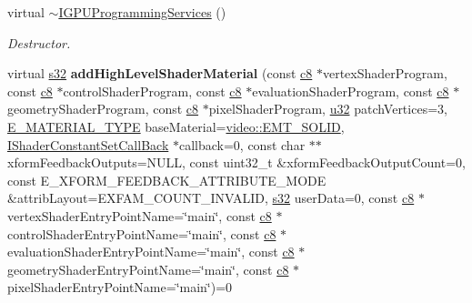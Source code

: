 \begin{DoxyCompactItemize}
\item 
virtual \hyperlink{classirr_1_1video_1_1IGPUProgrammingServices_a09d143ea5c55840c15ebcb84e8539bc0}{$\sim$\+I\+G\+P\+U\+Programming\+Services} ()\hypertarget{classirr_1_1video_1_1IGPUProgrammingServices_a09d143ea5c55840c15ebcb84e8539bc0}{}\label{classirr_1_1video_1_1IGPUProgrammingServices_a09d143ea5c55840c15ebcb84e8539bc0}

\begin{DoxyCompactList}\small\item\em Destructor. \end{DoxyCompactList}\item 
virtual \hyperlink{namespaceirr_ac66849b7a6ed16e30ebede579f9b47c6}{s32} {\bfseries add\+High\+Level\+Shader\+Material} (const \hyperlink{namespaceirr_a9395eaea339bcb546b319e9c96bf7410}{c8} $\ast$vertex\+Shader\+Program, const \hyperlink{namespaceirr_a9395eaea339bcb546b319e9c96bf7410}{c8} $\ast$control\+Shader\+Program, const \hyperlink{namespaceirr_a9395eaea339bcb546b319e9c96bf7410}{c8} $\ast$evaluation\+Shader\+Program, const \hyperlink{namespaceirr_a9395eaea339bcb546b319e9c96bf7410}{c8} $\ast$geometry\+Shader\+Program, const \hyperlink{namespaceirr_a9395eaea339bcb546b319e9c96bf7410}{c8} $\ast$pixel\+Shader\+Program, \hyperlink{namespaceirr_a0416a53257075833e7002efd0a18e804}{u32} patch\+Vertices=3, \hyperlink{namespaceirr_1_1video_ac8e9b6c66f7cebabd1a6d30cbc5430f1}{E\+\_\+\+M\+A\+T\+E\+R\+I\+A\+L\+\_\+\+T\+Y\+PE} base\+Material=\hyperlink{namespaceirr_1_1video_ac8e9b6c66f7cebabd1a6d30cbc5430f1a9bc471b9c18c9e2d20496004d2a2e803}{video\+::\+E\+M\+T\+\_\+\+S\+O\+L\+ID}, \hyperlink{classirr_1_1video_1_1IShaderConstantSetCallBack}{I\+Shader\+Constant\+Set\+Call\+Back} $\ast$callback=0, const char $\ast$$\ast$xform\+Feedback\+Outputs=N\+U\+LL, const uint32\+\_\+t \&xform\+Feedback\+Output\+Count=0, const E\+\_\+\+X\+F\+O\+R\+M\+\_\+\+F\+E\+E\+D\+B\+A\+C\+K\+\_\+\+A\+T\+T\+R\+I\+B\+U\+T\+E\+\_\+\+M\+O\+DE \&attrib\+Layout=E\+X\+F\+A\+M\+\_\+\+C\+O\+U\+N\+T\+\_\+\+I\+N\+V\+A\+L\+ID, \hyperlink{namespaceirr_ac66849b7a6ed16e30ebede579f9b47c6}{s32} user\+Data=0, const \hyperlink{namespaceirr_a9395eaea339bcb546b319e9c96bf7410}{c8} $\ast$vertex\+Shader\+Entry\+Point\+Name=\char`\"{}main\char`\"{}, const \hyperlink{namespaceirr_a9395eaea339bcb546b319e9c96bf7410}{c8} $\ast$control\+Shader\+Entry\+Point\+Name=\char`\"{}main\char`\"{}, const \hyperlink{namespaceirr_a9395eaea339bcb546b319e9c96bf7410}{c8} $\ast$evaluation\+Shader\+Entry\+Point\+Name=\char`\"{}main\char`\"{}, const \hyperlink{namespaceirr_a9395eaea339bcb546b319e9c96bf7410}{c8} $\ast$geometry\+Shader\+Entry\+Point\+Name=\char`\"{}main\char`\"{}, const \hyperlink{namespaceirr_a9395eaea339bcb546b319e9c96bf7410}{c8} $\ast$pixel\+Shader\+Entry\+Point\+Name=\char`\"{}main\char`\"{})=0\hypertarget{classirr_1_1video_1_1IGPUProgrammingServices_a6437f640a4c06a3dd5b79b0c82360970}{}\label{classirr_1_1video_1_1IGPUProgrammingServices_a6437f640a4c06a3dd5b79b0c82360970}


\end{DoxyCompactItemize}
